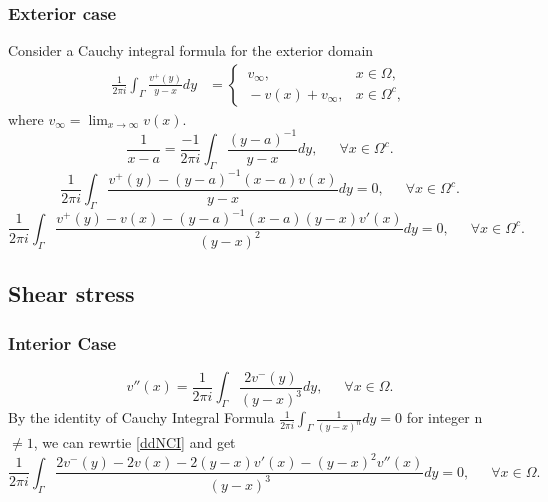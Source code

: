 \documentclass[preprint, 10pt]{elsarticle}
\begin{document}
\subsubsection{Exterior case}
Consider a Cauchy integral formula for the exterior domain
\begin{align}\label{CIFE}
\frac{1}{2\pi i}\int_{\Gamma}\frac{v^+({ y})}{{ y}-{ x}} d{ y}
&=\begin{cases}
\,v_{\infty}, &{ x} \in \Omega,\\ 
\,-v(x)+v_{\infty},  &{ x} \in \Omega^c,
\end{cases}
\end{align}
where $v_{\infty}=\displaystyle\lim_{x \to \infty}v(x)$.
\begin{equation}
\frac{1}{x-a}=\frac{-1}{2 \pi i} \int_{\Gamma}\frac{(y-a)^{-1}}{y-x} d{ y},\,\,\,\,\,\,\,\,\, \forall { x} \in \Omega^c.
\end{equation}
\begin{equation}
\frac{1}{2\pi i}\int_{\Gamma}\frac{v^+({ y})-(y-a)^{-1}(x-a)v(x)}{y-x} d{ y}=0,\,\,\,\,\,\,\,\,\, \forall { x} \in \Omega^c.
\end{equation}
\begin{equation}
\frac{1}{2\pi i}\int_{\Gamma}\frac{v^+({ y})-v(x)-(y-a)^{-1}(x-a)(y-x)v'(x)}{(y-x)^2} d{ y}=0,\,\,\,\,\,\,\,\,\, \forall { x} \in \Omega^c.
\end{equation}

\subsection{Shear stress}
\label{sec:shearStress}
\subsubsection{Interior Case}
\begin{equation}\label{ddNCI}
v''({x})=\frac{1}{2\pi i}\int_{\Gamma}\frac{2v^-({ y})}{(y- x)^3} d{ y},\,\,\,\,\,\,\,\,\, \forall { x} \in \Omega.
\end{equation}
By the identity of Cauchy Integral Formula $\displaystyle\frac{1}{2 \pi i}\int_{\Gamma}\frac{1}{( y- x)^n} d{ y}=0$ for integer n $\neq 1$, we can rewrtie \eqref{ddNCI} and get 
\begin{equation}
\frac{1}{2\pi i}\int_{\Gamma}\frac{2v^-({ y})-2v(x)-2(y-x)v'(x)-(y-x)^2v''(x)}{(y-x)^3} d{ y}=0,\,\,\,\,\,\,\,\,\, \forall { x} \in \Omega.
\end{equation}
\end{document}
